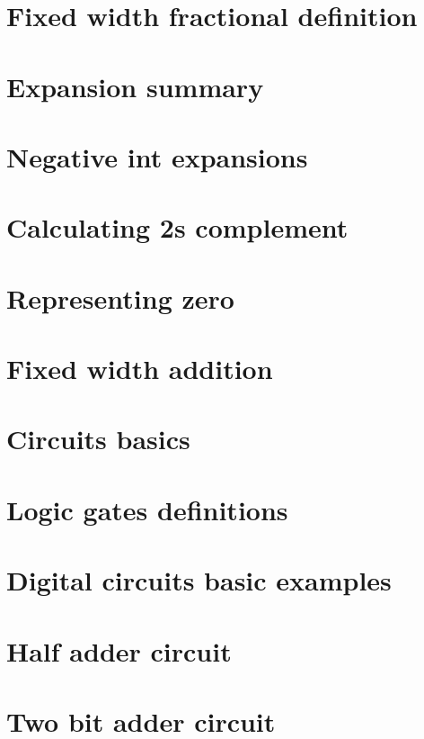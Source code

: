 \section*{Fixed width fractional definition}

\vfill
\section*{Expansion summary}

\vfill
\section*{Negative int expansions}

\vfill
\section*{Calculating 2s complement}

\vfill
\section*{Representing zero}

\vfill
\section*{Fixed width addition}

\vfill
\section*{Circuits basics}

\vfill
\section*{Logic gates definitions}

\vfill
\section*{Digital circuits basic examples}

\vfill
\section*{Half adder circuit}

\vfill
\section*{Two bit adder circuit}

\vfill

